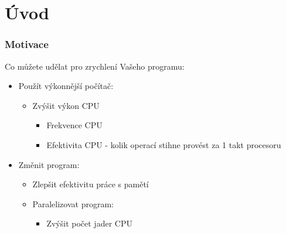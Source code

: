 \documentclass{beamer}
\subtitle{Lekce 01. Úvod}
\author{Pavel Píša \phantom{xxxxxxxxx} Petr Štěpán \\ \small\texttt{pisa@fel.cvut.cz}\phantom{xxxx}\small\texttt{stepan@fel.cvut.cz}}
\begin{document}
\maketitle

\section{Úvod}


\begin{frame}
\frametitle{Motivace}
Co můžete udělat pro zrychlení Vašeho programu:
\begin{itemize}
\item Použít výkonnější počítač:
  \begin{itemize}
  \item Zvýšit výkon CPU 
    \begin{itemize}
    \item Frekvence CPU
    \item Efektivita CPU - kolik operací stihne provést za 1 takt procesoru
    \end{itemize}
  \end{itemize}
\item Změnit program:
  \begin{itemize}
  \item Zlepšit efektivitu práce s pamětí
  \item Paralelizovat program:
    \begin{itemize}
    \item Zvýšit počet jader CPU
    \end{itemize}
  \end{itemize}
\end{itemize}
\end{frame}
\end{document}
